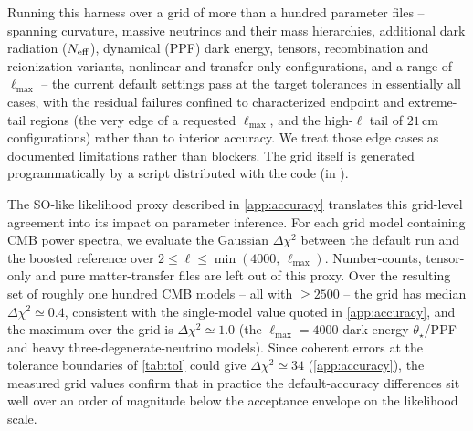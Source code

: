 \documentclass[prd, twocolumn, superscriptaddress, tightenlines, longbibliography, nofootinbib, eqsecnum, amsfonts, amsmath, floatfix, notitlepage]{revtex4-2}
\newcommand{\code}[1]{\texttt{\detokenize{#1}}}
\begin{document}
Running this harness over a grid of more than a hundred parameter files --
spanning curvature, massive neutrinos and their mass hierarchies, additional
dark radiation ($N_{\rm eff}$), dynamical (PPF) dark energy, tensors,
recombination and reionization variants, nonlinear and transfer-only
configurations, and a range of $\ell_{\max}$ -- the current default settings pass
at the target tolerances in essentially all cases, with the residual failures
confined to characterized endpoint and extreme-tail regions (the very edge of a
requested $\ell_{\max}$, and the high-$\ell$ tail of $21\,$cm configurations)
rather than to interior accuracy. We treat those edge cases as documented
limitations rather than blockers. The grid itself is generated programmatically
by a script distributed with the code (in \code{fortran/tests}).

The SO-like likelihood proxy described in \cref{app:accuracy} translates this
grid-level agreement into its impact on parameter inference. For each grid model
containing CMB power spectra, we evaluate the Gaussian $\Delta\chi^2$ between the
default run and the boosted reference over $2\le\ell\le\min(4000,\,\ell_{\max})$.
Number-counts, tensor-only and pure matter-transfer files are left
out of this proxy. Over the resulting set of roughly one hundred
CMB models -- all with \code{l_max_scalar}$\ge2500$ -- the grid has median
$\Delta\chi^2\simeq0.4$, consistent with the single-model value quoted in
\cref{app:accuracy}, and the maximum over the grid is $\Delta\chi^2\simeq1.0$
(the $\ell_{\max}=4000$ dark-energy $\theta_\star$/PPF and heavy
three-degenerate-neutrino models). Since coherent errors at the tolerance
boundaries of \cref{tab:tol} could give $\Delta\chi^2\simeq34$
(\cref{app:accuracy}), the measured grid values confirm that in practice the
default-accuracy differences sit well over an order of magnitude below the
acceptance envelope on the likelihood scale.
\end{document}
